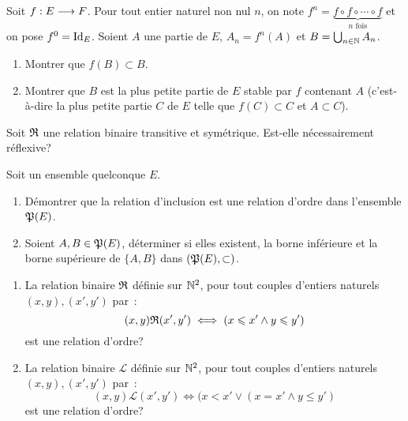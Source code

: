 \begin{exercice}
  Soit \(f:E \longrightarrow F\). Pour tout entier naturel non nul \(n\), on 
  note \(f^n = \underbrace{f \circ f \circ \cdots \circ f}_{n \textrm{~fois}}\) 
  et on pose \(f^0 = \operatorname{Id}_E\). Soient \(A\) une partie de \(E\), \(A_n 
  = f^{n}(A)\) et \(B = \bigcup_{n\in \mathbb{N}} A_n\).
  \begin{enumerate}
    \item Montrer que \(f(B) \subset B\).
    \item Montrer que \(B\) est la plus petite partie de \(E\) stable par 
      \(f\) contenant \(A\) (c'est-à-dire la plus petite partie \(C\) de 
      \(E\) telle que \(f(C) \subset C\) et \(A \subset C\)).
  \end{enumerate}
\end{exercice}

\begin{exercice}
  Soit \(\mathfrak{R}\) une relation binaire transitive et symétrique. Est-elle 
  nécessairement réflexive?
\end{exercice}

\begin{exercice}
  Soit un ensemble quelconque \(E\).
  \begin{enumerate}
    \item Démontrer que la relation d'inclusion est une relation d'ordre 
      dans l'ensemble \(\mathfrak{P}(E)\).
    \item Soient \(A, B \in \mathfrak{P}(E)\), déterminer si elles existent, la 
      borne inférieure et la borne supérieure de \(\{A, B\}\) dans 
      \((\mathfrak{P}(E), \subset)\).
  \end{enumerate}
\end{exercice}

\begin{exercice}
  \begin{enumerate}
    \item La relation binaire \(\mathfrak{R}\) définie sur \(\mathbb{N}^2\), pour tout 
      couples d'entiers naturels \((x, y), (x', y')\) par~: 
      \[(x, y)\mathfrak{R}{}(x', y') \iff (x \leqslant x' \land y \leqslant y')\] 
      est une relation d'ordre?
    \item La relation binaire \(\mathcal{L}\) définie sur \(\mathbb{N}^2\), pour 
      tout couples d'entiers naturels \((x, y), (x', y')\) par~: 
      \[(x, y)\mathcal{L}(x', y') \iff (x < x' \lor (x = x' \land y 
      \leqslant y')\] est une relation d'ordre?
  \end{enumerate}
\end{exercice}
